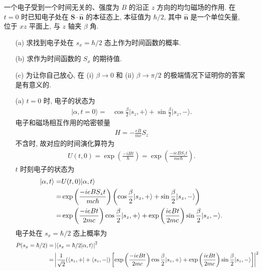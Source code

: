 \documentclass{assignment}
\begin{document}
\begin{prob}[课本习题 2.3]
    一个电子受到一个时间无关的、强度为 $B$ 的沿正 $z$ 方向的均匀磁场的作用. 在 $t=0$ 时已知电子处在 $\bm{S}\cdot\hat{\bm{n}}$ 的本征态上, 本征值为 $\hbar/2$, 其中 $\hat{\bm{n}}$ 是一个单位矢量, 位于 $xz$ 平面上, 与 $z$ 轴夹 $\beta$ 角.
    \begin{itemize}
        \item[(a)] 求找到电子处在 $s_x=\hbar/2$ 态上作为时间函数的概率.
        \item[(b)] 求作为时间函数的 $S_x$ 的期待值.
        \item[(c)] 为让你自己放心, 在 (i) $\beta\rightarrow 0$ 和 (ii) $\beta\rightarrow\pi/2$ 的极端情况下证明你的答案是有意义的.
    \end{itemize}
\end{prob}
\begin{sol}
    \begin{itemize}
        \item[(a)] $t=0$ 时, 电子的状态为
        \begin{align}
            \lvert\alpha,t=0\rangle=&\cos\frac{\beta}{2}\lvert s_z,+\rangle+\sin\frac{\beta}{2}\lvert s_z,-\rangle.
        \end{align}
        电子和磁场相互作用的哈密顿量
        \begin{align}
            H=-\frac{eB}{mc}S_z
        \end{align}
        不含时, 故对应的时间演化算符为
        \begin{align}
            U(t,0)=\exp\left(\frac{-iHt}{\hbar}\right)=\exp\left(\frac{-ieBS_zt}{mc\hbar}\right).
        \end{align}
        $t$ 时刻电子的状态为
        \begin{align}
            \notag\lvert\alpha,t\rangle=&U(t,0)\lvert\alpha,t\rangle\\
            \notag=&\exp\left(\frac{-ieBS_zt}{mc\hbar}\right)\left(\cos\frac{\beta}{2}\lvert s_z,+\rangle+\sin\frac{\beta}{2}\lvert s_z,-\rangle\right)\\
            =&\exp\left(\frac{-ieBt}{2mc}\right)\cos\frac{\beta}{2}\lvert s_z,+\rangle+\exp\left(\frac{ieBt}{2mc}\right)\sin\frac{\beta}{2}\lvert s_z,-\rangle.
        \end{align}
        电子处在 $s_x=\hbar/2$ 态上概率为
        \begin{align}
            \notag P(s_x=\hbar/2)=&\abs{\langle s_x=\hbar/2\vert\alpha,t\rangle}^2\\
            \notag=&\abs{\frac{1}{\sqrt{2}}(\langle s_z,+\rvert+\langle s_z,-\rvert)\left[\exp\left(\frac{-ieBt}{2mc}\right)\cos\frac{\beta}{2}\lvert s_z,+\rangle+\exp\left(\frac{ieBt}{2mc}\right)\sin\frac{\beta}{2}\lvert s_z,-\rangle\right]}^2\\

\end{align}
\end{itemize}
\end{sol}
\end{document}
